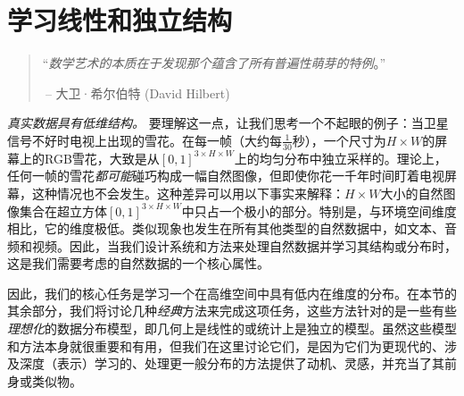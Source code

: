 \documentclass[../../book-main.tex]{subfiles}
\begin{document}
\chapter{学习线性和独立结构}
\label{ch:classic}\label{ch:linear-independent}

\begin{quote}
\hfill  ``{\em 数学艺术的本质在于发现那个蕴含了所有普遍性萌芽的特例}。''

$~$\hfill -- 大卫·希尔伯特 (David Hilbert)
\end{quote}
\vspace{5mm}







\textit{真实数据具有低维结构。} 要理解这一点，让我们思考一个不起眼的例子：当卫星信号不好时电视上出现的雪花。在每一帧（大约每\(\frac{1}{30}\)秒），一个尺寸为\(H \times W\)的屏幕上的RGB雪花，大致是从\([0, 1]^{3 \times H \times W}\)上的均匀分布中独立采样的。理论上，任何一帧的雪花\textit{都可能}碰巧构成一幅自然图像，但即使你花一千年时间盯着电视屏幕，这种情况也不会发生。这种差异可以用以下事实来解释：\(H \times W\)大小的自然图像集合在超立方体\([0, 1]^{3 \times H \times W}\)中只占一个极小的部分。特别是，与环境空间维度相比，它的维度极低。类似现象也发生在所有其他类型的自然数据中，如文本、音频和视频。因此，当我们设计系统和方法来处理自然数据并学习其结构或分布时，这是我们需要考虑的自然数据的一个核心属性。%

因此，我们的核心任务是学习一个在高维空间中具有低内在维度的分布。在本节的其余部分，我们将讨论几种\textit{经典}方法来完成这项任务，这些方法针对的是一些有些\textit{理想化}的数据分布模型，即几何上是线性的或统计上是独立的模型。虽然这些模型和方法本身就很重要和有用，但我们在这里讨论它们，是因为它们为更现代的、涉及深度（表示）学习的、处理更一般分布的方法提供了动机、灵感，并充当了其前身或类似物。
\end{document}
